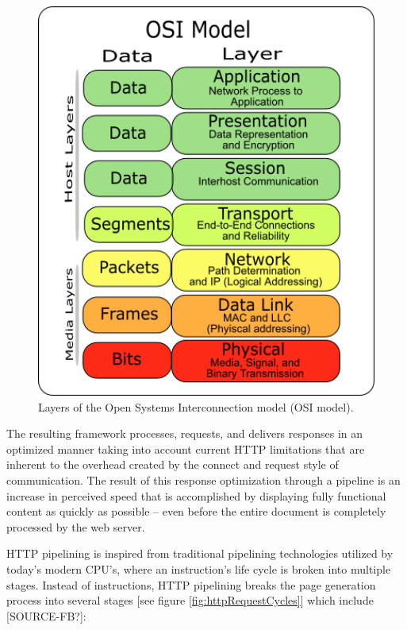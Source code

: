\documentclass[12pt]{report}
\begin{document}
\begin{figure}[H]
\caption{Layers of the Open Systems Interconnection model (OSI model).}
\label{fig:osiModel}
\centering
\includegraphics[width=125mm]{figures/images/osi_model.png}
\end{figure}

The resulting framework processes, requests, and delivers responses in an optimized manner taking into account current HTTP limitations that are inherent to the overhead created by the connect and request style of communication. The result of this response optimization through a pipeline is an increase in perceived speed that is accomplished by displaying fully functional content as quickly as possible – even before the entire document is completely processed by the web server.

HTTP pipelining is inspired from traditional pipelining technologies utilized by today’s modern CPU's, where an instruction's life cycle is broken into multiple stages. Instead of instructions, HTTP pipelining breaks the page generation process into several stages [see figure \ref{fig:httpRequestCycles}] which include [SOURCE-FB?]:
\end{document}
